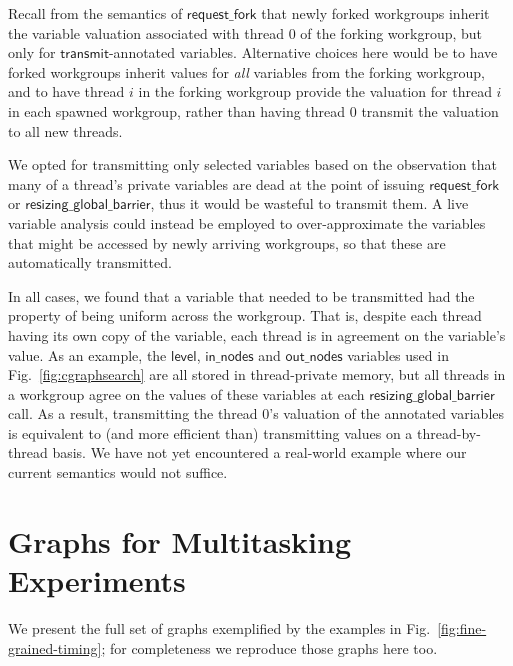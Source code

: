 \documentclass[sigconf]{acmart}
\newcommand{\myfig}{Fig.~}
\newcommand{\transmit}{\mathsf{transmit}}
\newcommand{\offerfork}{\mathsf{request\_fork}}
\newcommand{\resizingglobalbarrier}{\mathsf{resizing\_global\_barrier}}
\newcommand{\keyword}[1]{\mathsf{#1}}
\begin{document}
{
%
Recall from the semantics of $\offerfork$ that newly forked workgroups
inherit the variable valuation associated with thread 0 of the forking
workgroup, but only for $\transmit$-annotated variables.  Alternative
choices here would be to have forked workgroups inherit values for
\emph{all} variables from the forking workgroup, and to have thread
$i$ in the forking workgroup provide the valuation for thread $i$ in
each spawned workgroup, rather than having thread 0 transmit the
valuation to all new threads.

We opted for transmitting only selected variables based on the
observation that many of a thread's private variables are dead at the
point of issuing $\offerfork$ or $\resizingglobalbarrier$, thus it
would be wasteful to transmit them.  A live variable analysis could
instead be employed to over-approximate the variables that might be
accessed by newly arriving workgroups, so that these are automatically
transmitted.

In all cases, we found that a variable that needed to be transmitted
had the property of being uniform across the workgroup.  That is,
despite each thread having its own copy of the variable, each thread
is in agreement on the variable's value.  As an example, the
$\keyword{level}$, $\keyword{in\_nodes}$ and $\keyword{out\_nodes}$
variables used in \myfig\ref{fig:cgraphsearch} are all stored in thread-private
memory, but all threads in a workgroup agree on the values of these
variables at each $\resizingglobalbarrier$ call.  As a result,
transmitting the thread 0's valuation of the annotated variables is
equivalent to (and more efficient than) transmitting values on a
thread-by-thread basis.  We have not yet encountered a real-world
example where our current semantics would not suffice.


\section{Graphs for Multitasking Experiments}\label{appendix:extragraphs}

We present the full set of graphs exemplified by the examples in
\myfig\ref{fig:fine-grained-timing}; for completeness we reproduce
those graphs here too.

}
\end{document}
